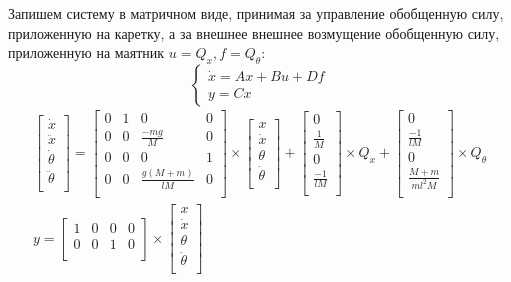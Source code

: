 Запишем систему в матричном виде, принимая за управление обобщенную силу, приложенную на каретку, а за внешнее 
внешнее возмущение обобщенную силу, приложенную на маятник $u = Q_x, f = Q_{\theta}$:
\begin{equation}
    \begin{cases}
        \dot{x} = Ax + Bu + Df \\ 
        y = Cx
    \end{cases}
    \label{eq:linear_model}
\end{equation}
\begin{equation}
    \begin{array}{cc}
        \begin{bmatrix}
        \dot{x} \\
        \ddot{x} \\
        \dot{\theta} \\
        \ddot{\theta} \\
    \end{bmatrix} = \begin{bmatrix}
        0 & 1 & 0 & 0 \\
        0 & 0 & \frac{-mg}{M} & 0 \\
        0 & 0 & 0 & 1 \\
        0 & 0 & \frac{g(M + m)}{lM} & 0 \\
    \end{bmatrix} \times \begin{bmatrix}
        x \\
        \dot{x} \\
        \theta \\
        \dot{\theta} \\
    \end{bmatrix} + \begin{bmatrix}
        0 \\
        \frac{1}{M} \\
        0 \\
        \frac{-1}{lM} \\
    \end{bmatrix} \times Q_x + \begin{bmatrix}
        0 \\
        \frac{-1}{lM} \\
        0 \\
        \frac{M + m}{ml^2M} \\ 
    \end{bmatrix} \times Q_{\theta}  \\[4em]
    y = \begin{bmatrix}
        1 & 0 & 0 & 0 \\
        0 & 0 & 1 & 0 \\ 
    \end{bmatrix} \times \begin{bmatrix}
        x \\
        \dot{x} \\
        \theta \\
        \dot{\theta} \\
    \end{bmatrix}
    \end{array}
\end{equation}
